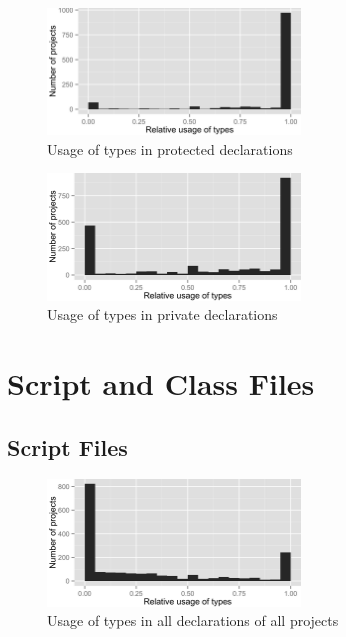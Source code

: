 \begin{figure}[h]
\centering 
\includegraphics[width=0.6\textwidth]{../aosd_2014/analysis/result/test/main/histograms/12_Protected.png} 
\caption{Usage of types in protected declarations}
\end{figure}

\begin{figure}[h]
\centering 
\includegraphics[width=0.6\textwidth]{../aosd_2014/analysis/result/test/main/histograms/11_Private.png} 
\caption{Usage of types in private declarations}
\end{figure}



\FloatBarrier

\section{Script and Class Files\label{a:script}}

\subsection*{Script Files}

\begin{figure}[h]
\centering 
\includegraphics[width=0.6\textwidth]{../aosd_2014/analysis/result/script/script/histograms/5_all_types.png} 
\caption{Usage of types in all declarations of all projects}
\end{figure}

